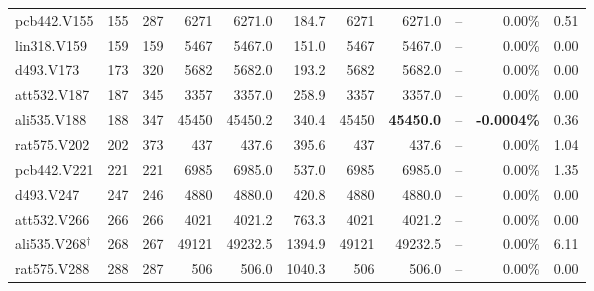 {\begin{longtable}{llr rrr rrr r r}
pcb442.V155 & 155 & 287 & 6271 & 6271.0 & 184.7 & 6271 & 6271.0 & -- & 0.00\% & 0.51 \\
lin318.V159 & 159 & 159 & 5467 & 5467.0 & 151.0 & 5467 & 5467.0 & -- & 0.00\% & 0.00 \\
d493.V173 & 173 & 320 & 5682 & 5682.0 & 193.2 & 5682 & 5682.0 & -- & 0.00\% & 0.00 \\
att532.V187 & 187 & 345 & 3357 & 3357.0 & 258.9 & 3357 & 3357.0 & -- & 0.00\% & 0.00 \\
ali535.V188 & 188 & 347 & 45450 & 45450.2 & 340.4 & 45450 & \textbf{45450.0} & -- & \textbf{-0.0004\%} & 0.36 \\
rat575.V202 & 202 & 373 & 437 & 437.6 & 395.6 & 437 & 437.6 & -- & 0.00\% & 1.04 \\
pcb442.V221 & 221 & 221 & 6985 & 6985.0 & 537.0 & 6985 & 6985.0 & -- & 0.00\% & 1.35 \\
d493.V247 & 247 & 246 & 4880 & 4880.0 & 420.8 & 4880 & 4880.0 & -- & 0.00\% & 0.00 \\
att532.V266 & 266 & 266 & 4021 & 4021.2 & 763.3 & 4021 & 4021.2 & -- & 0.00\% & 0.00 \\
ali535.V268$^\dagger$ & 268 & 267 & 49121 & 49232.5 & 1394.9 & 49121 & 49232.5 & -- & 0.00\% & 6.11 \\
rat575.V288 & 288 & 287 & 506 & 506.0 & 1040.3 & 506 & 506.0 & -- & 0.00\% & 0.00 \\
\end{longtable}}
